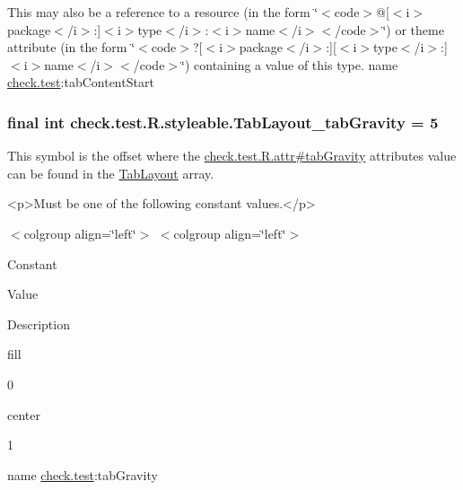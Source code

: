 This may also be a reference to a resource (in the form \char`\"{}$<$code$>$@\mbox{[}$<$i$>$package$<$/i$>$\+:\mbox{]}$<$i$>$type$<$/i$>$\+:$<$i$>$name$<$/i$>$$<$/code$>$\char`\"{}) or theme attribute (in the form \char`\"{}$<$code$>$?\mbox{[}$<$i$>$package$<$/i$>$\+:\mbox{]}\mbox{[}$<$i$>$type$<$/i$>$\+:\mbox{]}$<$i$>$name$<$/i$>$$<$/code$>$\char`\"{}) containing a value of this type.  name \hyperlink{namespacecheck_1_1test}{check.\+test}\+:tab\+Content\+Start \hypertarget{classcheck_1_1test_1_1_r_1_1styleable_a32ac466824c24a1fb95264589256c0a3}{}
\subsubsection[{Tab\+Layout\+\_\+tab\+Gravity}]{\setlength{\rightskip}{0pt plus 5cm}final int check.\+test.\+R.\+styleable.\+Tab\+Layout\+\_\+tab\+Gravity = 5\hspace{0.3cm}{\ttfamily [static]}}\label{classcheck_1_1test_1_1_r_1_1styleable_a32ac466824c24a1fb95264589256c0a3}
This symbol is the offset where the \hyperlink{classcheck_1_1test_1_1_r_1_1attr_aa338d973c780b029f86890fee9cdcd55}{check.\+test.\+R.\+attr\#tab\+Gravity} attribute\textquotesingle{}s value can be found in the \hyperlink{classcheck_1_1test_1_1_r_1_1styleable_a2a3232e8d38a43f5131a16385abbbed8}{Tab\+Layout} array.

\begin{DoxyVerb}      <p>Must be one of the following constant values.</p>
\end{DoxyVerb}
 \begin{TabularC}{0}
\hline
\end{TabularC}
$<$colgroup align=\char`\"{}left\char`\"{}$>$ $<$colgroup align=\char`\"{}left\char`\"{}$>$ 

Constant

Value

Description 

{\ttfamily fill}

0

{\ttfamily center}

1

name \hyperlink{namespacecheck_1_1test}{check.\+test}\+:tab\+Gravity \hypertarget{classcheck_1_1test_1_1_r_1_1styleable_abe4a618bcb92a95c54007a1a200f0279}{}
